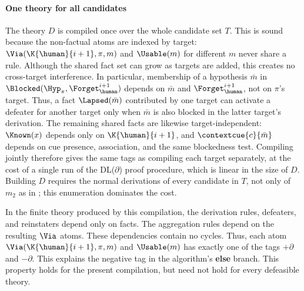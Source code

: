 \paragraph{One theory for all candidates}
The theory $D$ is compiled once over the whole candidate set $T$. This is sound because the non-factual atoms are indexed by target: $\Via(\K{\human}{i+1},\pi,m)$ and $\Usable(m)$ for different $m$ never share a rule. Although the shared fact set can grow as targets are added, this creates no cross-target interference. In particular, membership of a hypothesis $\bar m$ in $\Blocked(\Hyp_\pi,\Forget_\human^{i+1})$ depends on $\bar m$ and $\Forget_\human^{i+1}$, not on $\pi$'s target. Thus, a fact $\Lapsed(\bar m)$ contributed by one target can activate a defeater for another target only when $\bar m$ is also blocked in the latter target's derivation. The remaining shared facts are likewise target-independent: $\Known(x)$ depends only on $\K{\human}{i+1}$, and $\contextcue{c}{\bar m}$ depends on cue presence, association, and the same blockedness test. Compiling jointly therefore gives the same tags as compiling each target separately, at the cost of a single run of the DL($\partial$) proof procedure, which is linear in the size of $D$. Building $D$ requires the normal derivations of every candidate in $T$, not only of $m_2$ as in ; this enumeration dominates the cost.

In the finite theory produced by this compilation, the derivation rules, defeaters, and reinstaters depend only on facts. The aggregation rules depend on the resulting $\Via$ atoms. These dependencies contain no cycles. Thus, each atom $\Via(\K{\human}{i+1},\pi,m)$ and $\Usable(m)$ has exactly one of the tags $+\partial$ and $-\partial$. This explains the negative tag in the algorithm's \textbf{else} branch. This property holds for the present compilation, but need not hold for every defeasible theory.


